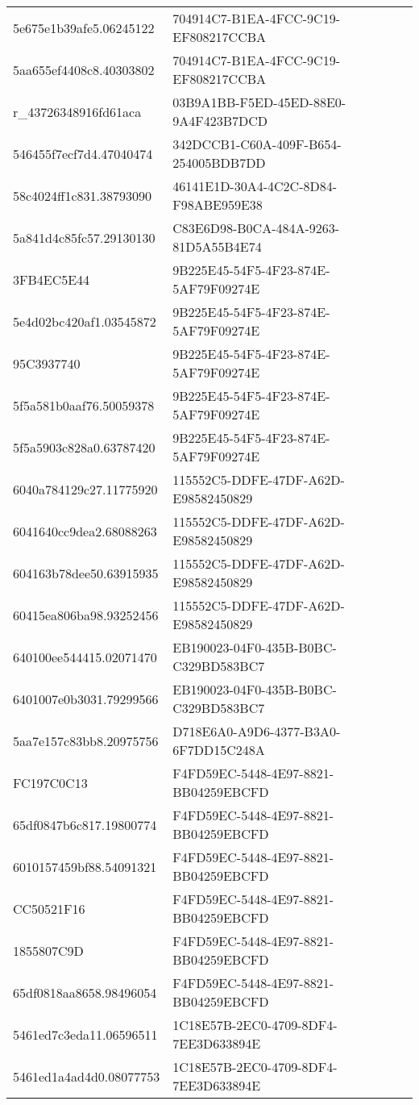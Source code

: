 \begin{tabular}{ll}
5e675e1b39afe5.06245122 & 704914C7-B1EA-4FCC-9C19-EF808217CCBA \\
5aa655ef4408c8.40303802 & 704914C7-B1EA-4FCC-9C19-EF808217CCBA \\
r_43726348916fd61aca & 03B9A1BB-F5ED-45ED-88E0-9A4F423B7DCD \\
546455f7ecf7d4.47040474 & 342DCCB1-C60A-409F-B654-254005BDB7DD \\
58c4024ff1c831.38793090 & 46141E1D-30A4-4C2C-8D84-F98ABE959E38 \\
5a841d4c85fc57.29130130 & C83E6D98-B0CA-484A-9263-81D5A55B4E74 \\
3FB4EC5E44 & 9B225E45-54F5-4F23-874E-5AF79F09274E \\
5e4d02bc420af1.03545872 & 9B225E45-54F5-4F23-874E-5AF79F09274E \\
95C3937740 & 9B225E45-54F5-4F23-874E-5AF79F09274E \\
5f5a581b0aaf76.50059378 & 9B225E45-54F5-4F23-874E-5AF79F09274E \\
5f5a5903c828a0.63787420 & 9B225E45-54F5-4F23-874E-5AF79F09274E \\
6040a784129c27.11775920 & 115552C5-DDFE-47DF-A62D-E98582450829 \\
6041640cc9dea2.68088263 & 115552C5-DDFE-47DF-A62D-E98582450829 \\
604163b78dee50.63915935 & 115552C5-DDFE-47DF-A62D-E98582450829 \\
60415ea806ba98.93252456 & 115552C5-DDFE-47DF-A62D-E98582450829 \\
640100ee544415.02071470 & EB190023-04F0-435B-B0BC-C329BD583BC7 \\
6401007e0b3031.79299566 & EB190023-04F0-435B-B0BC-C329BD583BC7 \\
5aa7e157c83bb8.20975756 & D718E6A0-A9D6-4377-B3A0-6F7DD15C248A \\
FC197C0C13 & F4FD59EC-5448-4E97-8821-BB04259EBCFD \\
65df0847b6c817.19800774 & F4FD59EC-5448-4E97-8821-BB04259EBCFD \\
6010157459bf88.54091321 & F4FD59EC-5448-4E97-8821-BB04259EBCFD \\
CC50521F16 & F4FD59EC-5448-4E97-8821-BB04259EBCFD \\
1855807C9D & F4FD59EC-5448-4E97-8821-BB04259EBCFD \\
65df0818aa8658.98496054 & F4FD59EC-5448-4E97-8821-BB04259EBCFD \\
5461ed7c3eda11.06596511 & 1C18E57B-2EC0-4709-8DF4-7EE3D633894E \\
5461ed1a4ad4d0.08077753 & 1C18E57B-2EC0-4709-8DF4-7EE3D633894E \\

\end{tabular}
